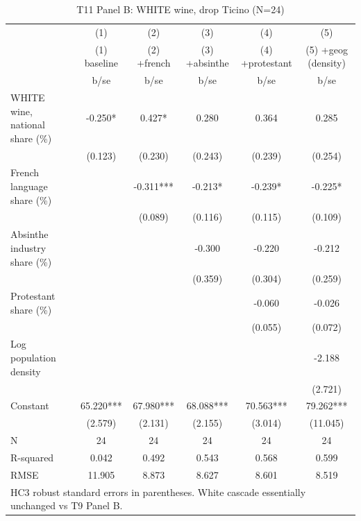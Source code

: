 \begin{table}[htbp]\centering
\def\sym#1{\ifmmode^{#1}\else\(^{#1}\)\fi}
\caption{T11 Panel B: WHITE wine, drop Ticino (N=24) \label{tab:T11\_B}}
\begin{tabular}{l*{5}{c}}
\toprule
            &\multicolumn{1}{c}{(1)}&\multicolumn{1}{c}{(2)}&\multicolumn{1}{c}{(3)}&\multicolumn{1}{c}{(4)}&\multicolumn{1}{c}{(5)}\\
            &\multicolumn{1}{c}{(1) baseline}&\multicolumn{1}{c}{(2) +french}&\multicolumn{1}{c}{(3) +absinthe}&\multicolumn{1}{c}{(4) +protestant}&\multicolumn{1}{c}{(5) +geog (density)}\\
            &        b/se   &        b/se   &        b/se   &        b/se   &        b/se   \\
\midrule
WHITE wine, national share (\%)&      -0.250*  &       0.427*  &       0.280   &       0.364   &       0.285   \\
            &     (0.123)   &     (0.230)   &     (0.243)   &     (0.239)   &     (0.254)   \\
French language share (\%)&               &      -0.311***&      -0.213*  &      -0.239*  &      -0.225*  \\
            &               &     (0.089)   &     (0.116)   &     (0.115)   &     (0.109)   \\
Absinthe industry share (\%)&               &               &      -0.300   &      -0.220   &      -0.212   \\
            &               &               &     (0.359)   &     (0.304)   &     (0.259)   \\
Protestant share (\%)&               &               &               &      -0.060   &      -0.026   \\
            &               &               &               &     (0.055)   &     (0.072)   \\
Log population density&               &               &               &               &      -2.188   \\
            &               &               &               &               &     (2.721)   \\
Constant    &      65.220***&      67.980***&      68.088***&      70.563***&      79.262***\\
            &     (2.579)   &     (2.131)   &     (2.155)   &     (3.014)   &    (11.045)   \\
\midrule
N           &          24   &          24   &          24   &          24   &          24   \\
R-squared   &       0.042   &       0.492   &       0.543   &       0.568   &       0.599   \\
RMSE        &      11.905   &       8.873   &       8.627   &       8.601   &       8.519   \\
\bottomrule
\multicolumn{6}{l}{\footnotesize HC3 robust standard errors in parentheses.  White cascade essentially unchanged vs T9 Panel B.}\\
\end{tabular}
\end{table}
